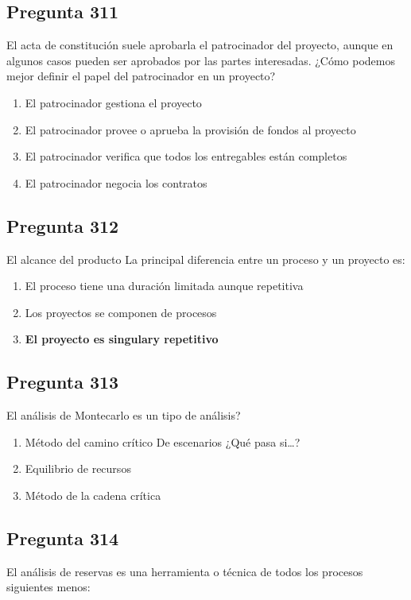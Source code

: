 \documentclass[11pt,a4paper]{article}
\begin{document}
\subsection*{Pregunta 311}
El acta de constitución suele aprobarla el patrocinador del proyecto, aunque en algunos casos pueden ser aprobados por las partes interesadas. ¿Cómo podemos mejor definir el papel del patrocinador en un proyecto?

\begin{enumerate}[label=\alph*)]
  \item El patrocinador gestiona el proyecto
  \item El patrocinador provee o aprueba la provisión de fondos al proyecto
  \item El patrocinador verifica que todos los entregables están completos
  \item El patrocinador negocia los contratos
\end{enumerate}

\subsection*{Pregunta 312}
El alcance del producto La principal diferencia entre un proceso y un proyecto es:

\begin{enumerate}[label=\alph*)]
  \item El proceso tiene una duración limitada aunque repetitiva
  \item Los proyectos se componen de procesos
  \item \textbf{El proyecto es singulary repetitivo}
\end{enumerate}

\subsection*{Pregunta 313}
El análisis de Montecarlo es un tipo de análisis?

\begin{enumerate}[label=\alph*)]
  \item Método del camino crítico De escenarios ¿Qué pasa si…?
  \item Equilibrio de recursos
  \item Método de la cadena crítica
\end{enumerate}

\subsection*{Pregunta 314}
El análisis de reservas es una herramienta o técnica de todos los procesos siguientes menos:
\end{document}

